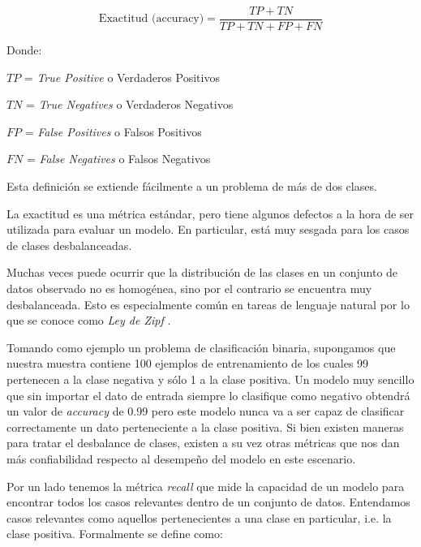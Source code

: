 \[
\text{Exactitud (accuracy)} = \frac{TP + TN}{TP + TN + FP + FN}
\]

Donde: 

\vspace{5.0mm}

$TP$ = \textit{True Positive} o Verdaderos Positivos

\vspace{1.0mm}

$TN$ = \textit{True Negatives} o Verdaderos Negativos

\vspace{1.0mm}

$FP$ = \textit{False Positives} o Falsos Positivos

\vspace{1.0mm}

$FN$ = \textit{False Negatives} o Falsos Negativos

\vspace{5.0mm}

Esta definición se extiende fácilmente a un problema de más de dos clases.

La exactitud es una métrica estándar, pero tiene algunos defectos a la hora de ser utilizada para evaluar un modelo. En particular, está muy sesgada para los casos de clases desbalanceadas.

Muchas veces puede ocurrir que la distribución de las clases en un conjunto de datos observado no es homogénea, sino por el contrario se encuentra muy desbalanceada. Esto es especialmente común en tareas de lenguaje natural por lo que se conoce como \textit{Ley de Zipf} \cite{j:zpf}.

Tomando como ejemplo un problema de clasificación binaria, supongamos que nuestra muestra contiene 100 ejemplos de entrenamiento de los cuales 99 pertenecen a la clase negativa y sólo 1 a la clase positiva. Un modelo muy sencillo que sin importar el dato de entrada siempre lo clasifique como negativo obtendrá un valor de \textit{accuracy} de 0.99 pero este modelo nunca va a ser capaz de clasificar correctamente un dato perteneciente a la clase positiva. Si bien existen maneras para tratar el desbalance de clases, existen a su vez otras métricas que nos dan más confiabilidad respecto al desempeño del modelo en este escenario.

Por un lado tenemos la métrica \textit{recall} que mide la capacidad de un modelo para encontrar todos los casos relevantes dentro de un conjunto de datos. Entendamos casos relevantes como aquellos pertenecientes a una clase en particular, i.e. la clase positiva. Formalmente se define como:

